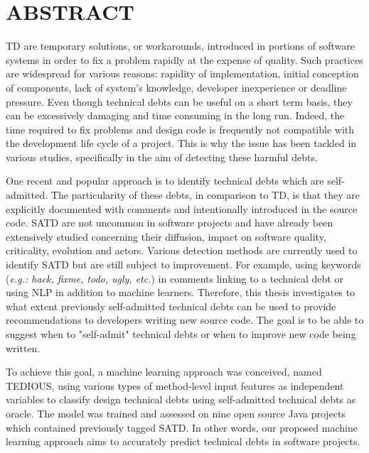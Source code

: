 %

\chapter*{ABSTRACT}\thispagestyle{headings}

\setlength{\parindent}{5ex} \ac{TD} are temporary solutions, or workarounds, introduced in portions of software systems in order to fix a problem rapidly at the expense of quality. Such practices are widespread for various reasons: rapidity of implementation, initial conception of components, lack of system's knowledge, developer inexperience or deadline pressure. Even though technical debts can be useful on a short term basis, they can be excessively damaging and time consuming in the long run. Indeed, the time required to fix problems and design code is frequently not compatible with the development life cycle of a project. This is why the issue has been tackled in various studies, specifically in the aim of detecting these harmful debts. \par

One recent and popular approach is to identify technical debts which are self-admitted. The particularity of these debts, in comparison to \ac{TD}, is that they are explicitly documented with comments and intentionally introduced in the source code. \ac{SATD} are not uncommon in software projects and have already been extensively studied concerning their diffusion, impact on software quality, criticality, evolution and actors. Various detection methods are currently used to identify \ac{SATD} but are still subject to improvement. For example, using keywords (\emph{e.g.: hack, fixme, todo, ugly, etc.}) in comments linking to a technical debt or using \ac{NLP} in addition to machine learners. Therefore, this thesis investigates to what extent previously self-admitted technical debts can be used to provide recommendations to developers writing new source code. The goal is to be able to suggest when to "self-admit" technical debts or when to improve new code being written. \par

To achieve this goal, a machine learning approach was conceived, named \ac{TEDIOUS}, using various types of method-level input features as independent variables to classify design technical debts using self-admitted technical debts as oracle. The model was trained and assessed on nine open source Java projects which contained previously tagged \ac{SATD}. In other words, our proposed machine learning approach aims to accurately predict technical debts in software projects. \par

